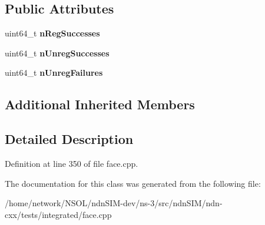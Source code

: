 \subsection*{Public Attributes}
\begin{DoxyCompactItemize}
\item 
uint64\+\_\+t {\bfseries n\+Reg\+Successes}\hypertarget{classndn_1_1tests_1_1FacesFixture3_ad02522be07de2811d0a171538df6353b}{}\label{classndn_1_1tests_1_1FacesFixture3_ad02522be07de2811d0a171538df6353b}

\item 
uint64\+\_\+t {\bfseries n\+Unreg\+Successes}\hypertarget{classndn_1_1tests_1_1FacesFixture3_aa56106c9b8e4cee3db0a83c2e492871c}{}\label{classndn_1_1tests_1_1FacesFixture3_aa56106c9b8e4cee3db0a83c2e492871c}

\item 
uint64\+\_\+t {\bfseries n\+Unreg\+Failures}\hypertarget{classndn_1_1tests_1_1FacesFixture3_a4c6094a1af3a3c109b48489d5d12c1b1}{}\label{classndn_1_1tests_1_1FacesFixture3_a4c6094a1af3a3c109b48489d5d12c1b1}

\end{DoxyCompactItemize}
\subsection*{Additional Inherited Members}


\subsection{Detailed Description}


Definition at line 350 of file face.\+cpp.



The documentation for this class was generated from the following file\+:\begin{DoxyCompactItemize}
\item 
/home/network/\+N\+S\+O\+L/ndn\+S\+I\+M-\/dev/ns-\/3/src/ndn\+S\+I\+M/ndn-\/cxx/tests/integrated/face.\+cpp\end{DoxyCompactItemize}
